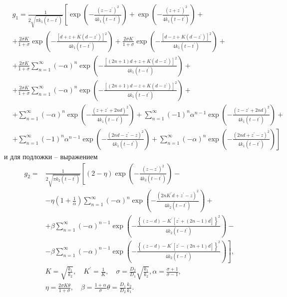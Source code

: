 \begin{equation}
	\begin{aligned}
		&g_1=\frac{1}{2 \sqrt{\pi k_1\left(t-t^{\prime}\right)}}\left[\exp \left(-\frac{\left(z-z^{\prime}\right)^2}{4 k_1\left(t-t^{\prime}\right)}\right)\right.+\exp \left(-\frac{\left(z+z^{\prime}\right)^2}{4 k_1\left(t-t^{\prime}\right)}\right)+ \\
		&+\frac{2 \sigma K}{1+\sigma} \exp \left(-\frac{\left[d+z+K\left(d-z^{\prime}\right)\right]^2}{4 k_1\left(t-t^{\prime}\right)}\right)+\frac{2 \sigma K}{1+\sigma} \exp \left(-\frac{\left[d-z+K\left(d-z^{\prime}\right)\right]^2}{4 k_1\left(t-t^{\prime}\right)}\right)+ \\
		&+\frac{2 \sigma K}{1+\sigma} \sum_{n=1}^{\infty}(-\alpha)^n \exp \left(-\frac{\left[(2 n+1) d+z+K\left(d-z^{\prime}\right)\right]^2}{4 k_1\left(t-t^{\prime}\right)}\right)+ \\
		&+\frac{2 \sigma K}{1+\sigma} \sum_{n=1}^{\infty}(-\alpha)^n \exp \left(-\frac{\left[(2 n+1) d-z+K\left(d-z^{\prime}\right)\right]^2}{4 k_1\left(t-t^{\prime}\right)}\right)+ \\
		&+\sum_{n=1}^{\infty}(-\alpha)^n \exp \left(-\frac{\left(z+z^{\prime}+2 n d\right)^2}{4 k_1\left(t-t^{\prime}\right)}\right)+\sum_{n=1}^{\infty}(-1)^n \alpha^{n-1} \exp \left(-\frac{\left(z-z^{\prime}+2 n d\right)^2}{4 k_1\left(t-t^{\prime}\right)}\right)+ \\
		&+\sum_{n=1}^{\infty}(-1)^n \alpha^{n-1} \exp \left(-\frac{\left(2 n d-z^{\prime}-z\right)^2}{4 k_1\left(t-t^{\prime}\right)}\right)+\left.\sum_{n=1}^{\infty}(-\alpha)^n \exp \left(-\frac{\left(2 n d+z^{\prime}-z\right)^2}{4 k_1\left(t-t^{\prime}\right)}\right)\right]
	\end{aligned}
\end{equation}
и для подложки -- выражением
\begin{equation}
	\begin{aligned}
		g_2=& \frac{1}{2 \sqrt{\pi k_2\left(t-t^{\prime}\right)}}\left[(2-\eta) \exp \left(-\frac{\left(z-z^{\prime}\right)^2}{4 k_2\left(t-t^{\prime}\right)}\right)\right.- \\
		&-\eta\left(1+\frac{1}{\alpha}\right) \sum_{n=1}^{\infty}(-\alpha)^n \exp \left(-\frac{\left(2 n K^{\prime} d+z^{\prime}-z\right)^2}{4 k_2\left(t-t^{\prime}\right)}\right)+ \\
		&+\beta \sum_{n=1}^{\infty}(-\alpha)^{n-1} \exp \left(-\frac{\left\{(z-d)-K^{\prime}\left[z^{\prime}+(2 n-1) d\right]\right\}^2}{4 k_2\left(t-t^{\prime}\right)}\right)- \\
		&-\beta \sum_{n=1}^{\infty}(-\alpha)^{n-1}\left.\exp \left(-\frac{\left\{(z-d)-K^{\prime}\left[z^{\prime}-(2 n+1) d\right]\right\}^2}{4 k_2\left(t-t^{\prime}\right)}\right)\right], \\
		&K=\sqrt{\frac{k_1}{k_2}}, \quad K^{\prime}=\frac{1}{K}, \quad \sigma=\frac{D_2}{D_1} \sqrt{\frac{k_1}{k_2}}, \alpha=\frac{\sigma+1}{\sigma-1},\\
		&\eta=\frac{2 \sigma K \theta}{1+\sigma}, \quad \beta=\frac{1+\alpha}{\sigma} \theta=\frac{D_1}{D_2} \frac{k_2}{k_1}.
	\end{aligned}
\end{equation}
